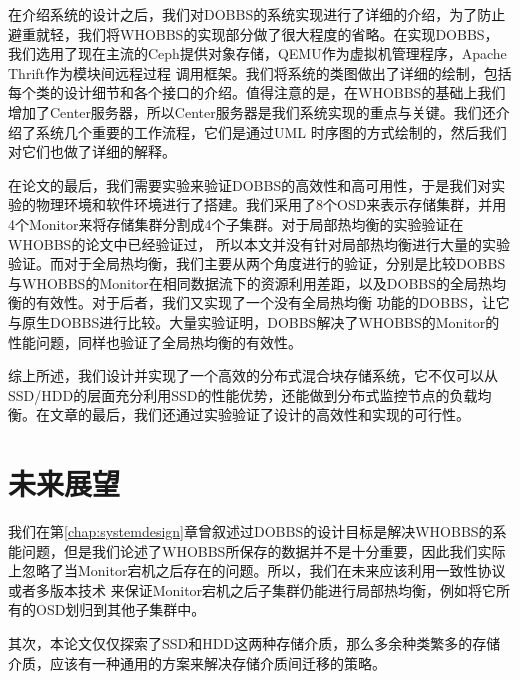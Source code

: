 在介绍系统的设计之后，我们对DOBBS的系统实现进行了详细的介绍，为了防止避重就轻，我们将WHOBBS的实现部分做了很大程度的省略。在实现DOBBS，我们选用了现在主流的Ceph提供对象存储，QEMU作为虚拟机管理程序，Apache Thrift作为模块间远程过程
调用框架。我们将系统的类图做出了详细的绘制，包括每个类的设计细节和各个接口的介绍。值得注意的是，在WHOBBS的基础上我们增加了Center服务器，所以Center服务器是我们系统实现的重点与关键。我们还介绍了系统几个重要的工作流程，它们是通过UML
时序图的方式绘制的，然后我们对它们也做了详细的解释。

在论文的最后，我们需要实验来验证DOBBS的高效性和高可用性，于是我们对实验的物理环境和软件环境进行了搭建。我们采用了8个OSD来表示存储集群，并用4个Monitor来将存储集群分割成4个子集群。对于局部热均衡的实验验证在WHOBBS的论文中已经验证过，
所以本文并没有针对局部热均衡进行大量的实验验证。而对于全局热均衡，我们主要从两个角度进行的验证，分别是比较DOBBS与WHOBBS的Monitor在相同数据流下的资源利用差距，以及DOBBS的全局热均衡的有效性。对于后者，我们又实现了一个没有全局热均衡
功能的DOBBS，让它与原生DOBBS进行比较。大量实验证明，DOBBS解决了WHOBBS的Monitor的性能问题，同样也验证了全局热均衡的有效性。

综上所述，我们设计并实现了一个高效的分布式混合块存储系统，它不仅可以从SSD/HDD的层面充分利用SSD的性能优势，还能做到分布式监控节点的负载均衡。在文章的最后，我们还通过实验验证了设计的高效性和实现的可行性。

\section{未来展望}
我们在第\ref{chap:systemdesign}章曾叙述过DOBBS的设计目标是解决WHOBBS的系能问题，但是我们论述了WHOBBS所保存的数据并不是十分重要，因此我们实际上忽略了当Monitor宕机之后存在的问题。所以，我们在未来应该利用一致性协议或者多版本技术
来保证Monitor宕机之后子集群仍能进行局部热均衡，例如将它所有的OSD划归到其他子集群中。

其次，本论文仅仅探索了SSD和HDD这两种存储介质，那么多余种类繁多的存储介质，应该有一种通用的方案来解决存储介质间迁移的策略。

